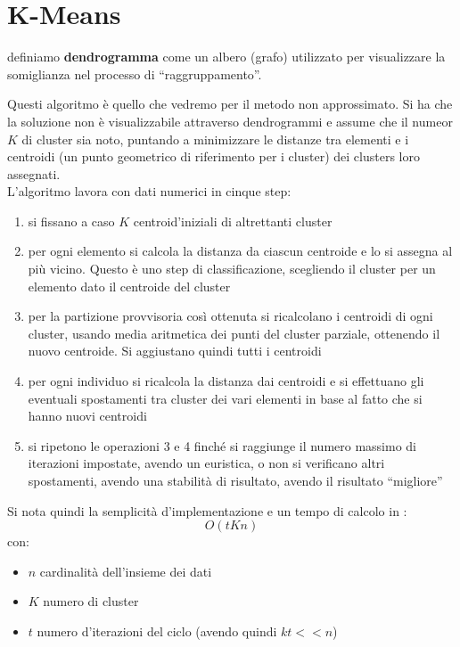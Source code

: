\section{K-Means}
\begin{definizione}
  definiamo \textbf{dendrogramma} come un albero (grafo) utilizzato per
  visualizzare la somiglianza nel processo di ``raggruppamento''.
  
\end{definizione}
Questi algoritmo è quello che vedremo per il metodo non approssimato. Si ha che
la  soluzione non è visualizzabile attraverso dendrogrammi e assume che il
numeor $K$ di cluster sia noto, puntando a minimizzare le distanze tra elementi
e i centroidi (un punto geometrico di riferimento per i cluster) dei clusters
loro assegnati.\\
L'algoritmo lavora con dati numerici in cinque step:
\begin{enumerate}
  \item si fissano a caso $K$ centroid'iniziali di altrettanti cluster
  \item per ogni elemento si calcola la distanza da ciascun centroide e lo si
  assegna al più vicino. Questo è uno step di classificazione, scegliendo il cluster
  per un elemento dato il centroide del cluster
  \item per la partizione provvisoria così ottenuta si ricalcolano i centroidi
  di ogni cluster, usando media aritmetica dei punti del cluster parziale,
  ottenendo il nuovo centroide. Si aggiustano quindi tutti i centroidi
  \item per ogni individuo si ricalcola la distanza dai centroidi e si
  effettuano gli eventuali spostamenti tra cluster dei vari elementi in base al
  fatto che si hanno nuovi centroidi
  \item si ripetono le operazioni 3 e 4 finché si raggiunge il numero massimo di
  iterazioni impostate, avendo un euristica, o non si verificano altri
  spostamenti, avendo una stabilità di risultato, avendo il risultato
  ``migliore'' 
\end{enumerate}
Si nota quindi la semplicità d'implementazione e un tempo di calcolo in :
\[O(tKn)\]
con:
\begin{itemize}
  \item $n$ cardinalità dell'insieme dei dati
  \item $K$ numero di cluster
  \item $t$ numero d'iterazioni del ciclo (avendo quindi $kt<<n$)
\end{itemize}
